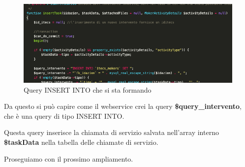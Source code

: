 \begin{figure}[!h] 
	\centering
	\includegraphics[scale = 0.5]{immagini/webservices/ampliamenti/2ampl_funzione_insert.png}
	\caption{Query INSERT INTO che si sta formando}
\end{figure}

\begin{flushleft}
	Da questo si può capire come il webservice crei la query \textbf{\$query\_intervento}, che è una query di tipo INSERT INTO.
	
	Questa query inserisce la chiamata di servizio salvata nell'array interno \textbf{\$taskData} nella tabella delle chiamate di servizio.
	
	\newspace
	
	Proseguiamo con il prossimo ampliamento.
\end{flushleft}

\newpage

